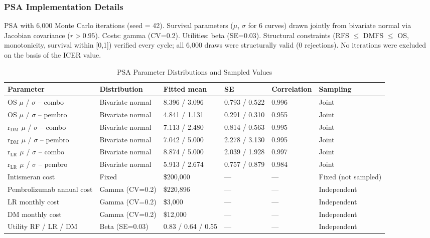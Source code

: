\documentclass[11pt,a4paper]{article}
\begin{document}
\subsubsection{PSA Implementation Details}
PSA with 6,000 Monte Carlo iterations (seed = 42). Survival parameters ($\mu$, $\sigma$ for 6 curves) drawn jointly from bivariate normal via Jacobian covariance ($r > 0.95$). Costs: gamma (CV=0.2). Utilities: beta (SE=0.03). Structural constraints (RFS $\leq$ DMFS $\leq$ OS, monotonicity, survival within [0,1]) verified every cycle; all 6,000 draws were structurally valid (0 rejections). No iterations were excluded on the basis of the ICER value.

\begin{landscape}
\begin{table}[p]
\centering
\caption{PSA Parameter Distributions and Sampled Values}
\label{tab:s12}
\footnotesize
\setlength{\tabcolsep}{5pt}
\begin{tabularx}{\linewidth}{@{}>{\raggedright\arraybackslash}Xlllll@{}}
\toprule
\textbf{Parameter} & \textbf{Distribution} & \textbf{Fitted mean} & \textbf{SE} & \textbf{Correlation} & \textbf{Sampling} \\
\midrule
OS $\mu$ / $\sigma$ -- combo & Bivariate normal & 8.396 / 3.096 & 0.793 / 0.522 & 0.996 & Joint \\
OS $\mu$ / $\sigma$ -- pembro & Bivariate normal & 4.841 / 1.131 & 0.291 / 0.310 & 0.955 & Joint \\
r$_{\text{DM}}$ $\mu$ / $\sigma$ -- combo & Bivariate normal & 7.113 / 2.480 & 0.814 / 0.563 & 0.995 & Joint \\
r$_{\text{DM}}$ $\mu$ / $\sigma$ -- pembro & Bivariate normal & 7.042 / 5.000 & 2.278 / 3.130 & 0.995 & Joint \\
r$_{\text{LR}}$ $\mu$ / $\sigma$ -- combo & Bivariate normal & 8.874 / 5.000 & 2.039 / 1.928 & 0.997 & Joint \\
r$_{\text{LR}}$ $\mu$ / $\sigma$ -- pembro & Bivariate normal & 5.913 / 2.674 & 0.757 / 0.879 & 0.984 & Joint \\
Intismeran cost & Fixed & \$200,000 & --- & --- & Fixed (not sampled) \\
Pembrolizumab annual cost & Gamma (CV=0.2) & \$220,896 & --- & --- & Independent \\
LR monthly cost & Gamma (CV=0.2) & \$3,000 & --- & --- & Independent \\
DM monthly cost & Gamma (CV=0.2) & \$12,000 & --- & --- & Independent \\
Utility RF / LR / DM & Beta (SE=0.03) & 0.83 / 0.64 / 0.55 & --- & --- & Independent \\
\bottomrule
\end{tabularx}
\end{table}
\end{landscape}
\end{document}
